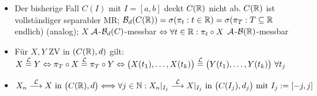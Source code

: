 \documentclass[12pt]{scrartcl}
\begin{document}
\begin{itemize}
		\item Der bisherige Fall $C(I)$ mit $I=[a,b]$ deckt $C(\mathbb{R})$ nicht ab.
	$C(\mathbb{R})$ ist vollständiger separabler MR; $\mathcal{B}_d(C(\mathbb{R}))=\sigma(\pi_t:t\in\mathbb{R})=\sigma(\pi_T:T\subseteq\mathbb{R}$ endlich) (analog);
	$X$ $\mathcal{A}$-$\mathcal{B}_d(C)$-messbar $\Leftrightarrow\forall t\in\mathbb{R}:\pi_t\circ X$ $\mathcal{A}$-$\mathcal{B}(\mathbb{R})$-messbar
		\item Für $X,Y$ ZV in $(C(\mathbb{R}),d)$ gilt: $X\overset{\mathcal{L}}{=}Y\Leftrightarrow\pi_T\circ X\overset{\mathcal{L}}{=}\pi_T\circ Y\Leftrightarrow\big(X(t_1),\ldots,X(t_k)\big)\overset{\mathcal{L}}{=}\big(Y(t_1),\ldots,Y(t_k)\big)~\forall t_j$
		\item $X_n\stackrel{\mathcal{L}}{\longrightarrow}X\text{ in }\big(C(\mathbb{R}),d\big)
		\Longleftrightarrow\forall j\in\mathbb{N}:
		X_n|_{I_j}\stackrel{\mathcal{L}}{\longrightarrow} X|_{I_j}\text{ in }\big(C(I_j),d_j\big)\text{ mit } I_j:=[-j,j]$
	\end{itemize}
\end{document}
